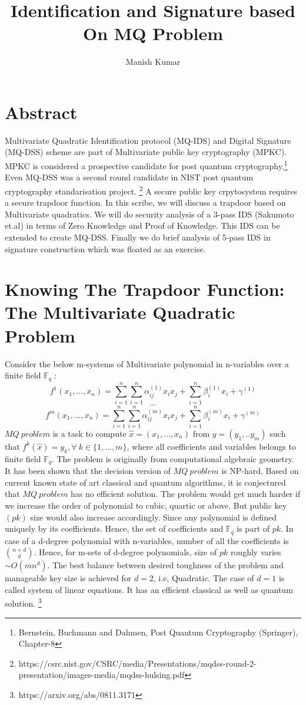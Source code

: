 \documentclass{article}
\title{Identification and Signature based On MQ Problem}
\author{Manish Kumar}
\begin{document}
\maketitle

\section*{Abstract} Multivariate Quadratic Identification protocol (MQ-IDS) and Digital Signature (MQ-DSS) scheme are part of Multivariate public key cryptography (MPKC). MPKC is considered a prospective candidate for post quantum cryptography.\footnote{Bernstein, Buchmann and Dahmen, Post Quantum Cryptography (Springer), Chapter-8} Even MQ-DSS was a second round candidate in NIST post quantum cryptography standarisation project.
\footnote{https://csrc.nist.gov/CSRC/media/Presentations/mqdss-round-2-presentation/images-media/mqdss-hulsing.pdf} A secure public key crpytosystem requires a secure trapdoor function. In this scribe, we will discuss a trapdoor based on Multivariate quadratics. We will do security analysis of a 3-pass IDS (Sakumoto et.al) in terms of Zero Knowledge and Proof of Knowledge. This IDS can be extended to create MQ-DSS. Finally we do brief analysis of 5-pass IDS in signature construction which was floated as an exercise. 
\section*{Knowing The Trapdoor Function: The Multivariate Quadratic Problem}
Consider the below m-systems of Multivariate polynomial in n-variables over a finite field $\mathbb{F}_q$ :
\[ f^{1}(x_1,...,x_n) = \sum_{i=1}^{n} \sum_{i=1}^{n} \alpha^{(1)}_{ij} x_i x_j + \sum_{i=1}^{n} \beta^{(1)}_i x_i +\gamma^{(1)} \]
\[ ... \]
\[ f^{m}(x_1,...,x_n) = \sum_{i=1}^{n} \sum_{i=1}^{n} \alpha^{(m)}_{ij} x_i x_j + \sum_{i=1}^{n} \beta^{(m)}_i x_i +\gamma^{(m)} \]
$MQ\ problem$ is a task to compute $\hat{x} = (x_1,...,x_n)$ from $y = (y_1,..y_m)$ such that $ f^{k}(\hat{x})=y_k, \forall\ k \in \{1,...,m\} $, where all coefficients and variables belongs to finite field $\mathbb{F}_q$. The problem is originally from computational algebraic geometry. It has been shown that the decision version of $MQ\ problem$ is NP-hard. Based on current known state of art classical and quantum algorithms, it is conjectured that $MQ\ problem$ has no efficient solution. The problem would get much harder if we increase the order of polynomial to cubic, quartic or above. But public key $(pk)$ size would also increase accordingly. Since any polynomial is defined uniquely by its coefficients. Hence, the set of coefficients and $\mathbb{F}_q$ is part of $pk$. In case of a d-degree polynomial with n-variables, number of all the coefficients is ${n+d \choose d}$. Hence, for m-sets of d-degree polynomials, size of $pk$ roughly varies $\sim O(mn^d)$. The best balance between desired toughness of the problem and manageable key size is achieved for $d=2$, i.e, Quadratic. The case of $d=1$ is called system of linear equations. It has an efficient classical as well as quantum solution. \footnote{https://arxiv.org/abs/0811.3171}
\end{document}

